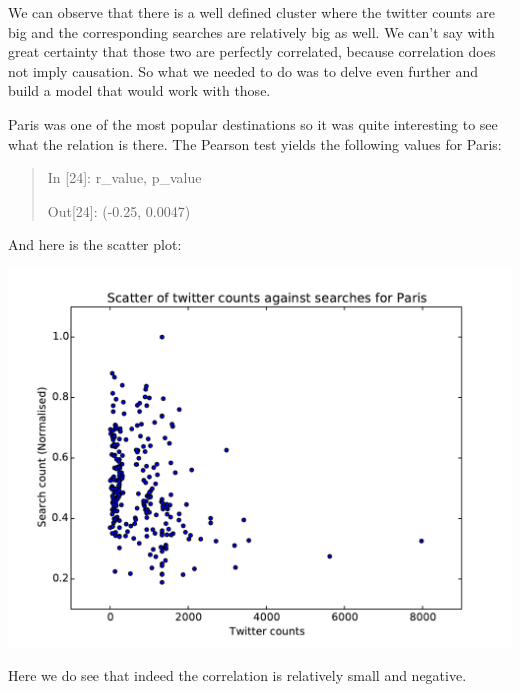 \documentclass[minf,frontabs,twoside,singlespacing,parskip]{infthesis}
\begin{document}
We can observe that there is a well defined cluster where the twitter counts are big and the corresponding searches are relatively big as well. We can't say with great certainty that those two are perfectly correlated, because correlation does not imply causation. So what we needed to do was to delve even further and build a model that would work with those.


Paris was one of the most popular destinations so it was quite interesting to see what the relation is there. The Pearson test yields the following values for Paris:
\begin{quotation}
In [24]: r\_value, p\_value

Out[24]: (-0.25, 0.0047)
\end{quotation}

And here is the scatter plot:

\includegraphics[width=\textwidth]{Paris}

Here we do see that indeed the correlation is relatively small and negative. 
\end{document}
